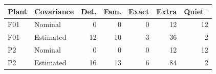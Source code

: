 \begin{tabular}{llrrrrr}\hline
Plant & Covariance & Det. & Fam. & Exact & Extra & Quiet$^+$\\\hline
F01 & Nominal & 0 & 0 & 0 & 12 & 12\\
F01 & Estimated & 12 & 10 & 3 & 36 & 2\\
P2 & Nominal & 0 & 0 & 0 & 12 & 12\\
P2 & Estimated & 16 & 13 & 6 & 84 & 2\\
\hline\end{tabular}
